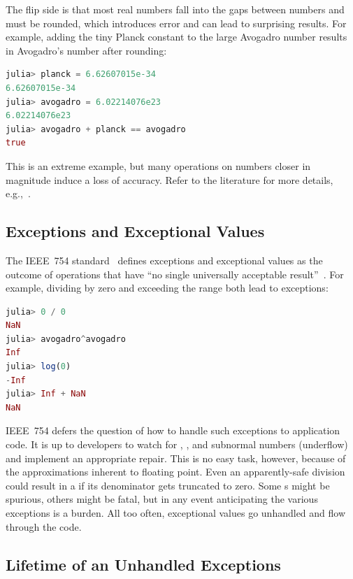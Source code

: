 \documentclass{juliacon}
\begin{document}
The flip side is that most real numbers fall into the gaps between \fp{} numbers and must be rounded, which introduces error
and can lead to surprising results.
For example, adding the tiny Planck constant to the large Avogadro number results
in Avogadro's number after rounding:

\begin{lstlisting}[language = Julia]
julia> planck = 6.62607015e-34
6.62607015e-34
julia> avogadro = 6.02214076e23
6.02214076e23
julia> avogadro + planck == avogadro
true
\end{lstlisting}

This is an extreme example, but many operations on \fp{} numbers closer in magnitude induce a loss of accuracy.
Refer to the literature for more details, e.g.,~\cite{knuthArtComputerProgramming1997,torontoPracticallyAccurateFloatingPoint2014,mullerHandbookFloatingPointArithmetic2018}.


\subsection{Exceptions and Exceptional Values}
\label{s:exnvalue}

The IEEE~754 \fp{} standard~\cite{IEEEStandardBinary1985}
defines exceptions and exceptional values as the outcome of
operations that have ``no single universally acceptable result''~\cite{p-draft-1997}.
For example, dividing by zero and exceeding the  range
both lead to exceptions:

\begin{lstlisting}[language = Julia]
julia> 0 / 0
NaN
julia> avogadro^avogadro
Inf
julia> log(0)
-Inf
julia> Inf + NaN
NaN
\end{lstlisting}

IEEE~754 defers the question of how to handle such exceptions to application code.
It is up to developers to watch for \Nan{}, \Inf{}, and subnormal numbers (underflow)
and implement an appropriate repair.
This is no easy task, however, because of the approximations inherent to
floating point.
Even an apparently-safe division could result in a \Nan{} if its
denominator gets truncated to zero.
Some \Nan{}s might be spurious, others might be fatal, but in any event
anticipating the various exceptions is a burden.
All too often, exceptional values go unhandled and flow through the code.


\subsection{Lifetime of an Unhandled Exceptions}
\label{s:to-kill-a-fp}
\end{document}
